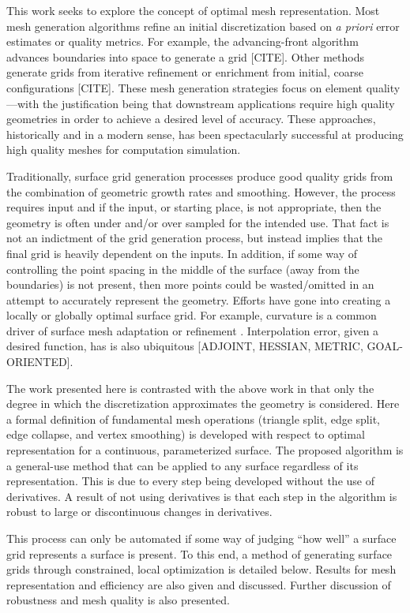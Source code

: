 This work seeks to explore the concept of optimal mesh representation.
Most mesh generation algorithms refine an initial discretization based
on {\it a priori} error estimates or quality metrics. For example, the
advancing-front algorithm advances boundaries into space to generate a
grid \cite{tristrano98, diaz-morcillo98}[CITE]. Other methods generate
grids from iterative refinement or enrichment from initial, coarse
configurations \cite{marcum98, marcum00, shewchuk02}[CITE]. These mesh
generation strategies focus on element quality---with the
justification being that downstream applications require high quality
geometries in order to achieve a desired level of accuracy. These
approaches, historically and in a modern sense, has been spectacularly
successful at producing high quality meshes for computation simulation.

Traditionally, surface grid generation processes produce good quality
grids from the combination of geometric growth rates and smoothing.
However, the process requires input and if the input, or starting place,
is not appropriate, then the geometry is often under and/or over sampled
for the intended use. That fact is not an indictment of the grid
generation process, but instead implies that the final grid is heavily
dependent on the inputs. In addition, if some way of controlling the
point spacing in the middle of the surface (away from the boundaries) is
not present, then more points could be wasted/omitted in an attempt to
accurately represent the geometry. Efforts have gone into
creating a locally or globally optimal surface grid. For example,
curvature is a common driver of surface mesh adaptation or refinement
\cite{siqueria13}. Interpolation error, given a desired function, has
is also ubiquitous [ADJOINT, HESSIAN, METRIC, GOAL-ORIENTED]\cite{}.

The work presented here is contrasted with the above work in that only
the degree in which the discretization approximates the geometry is
considered.  Here a formal definition of fundamental mesh operations
(triangle split, edge split, edge collapse, and vertex smoothing) is
developed with respect to optimal representation for a continuous,
parameterized surface. The proposed algorithm is a general-use method
that can be applied to any surface regardless of its representation.
This is due to every step being developed without the use of
derivatives. A result of not using derivatives is that each step in the
algorithm is robust to large or discontinuous changes in derivatives.

This process can only be automated if some way of judging ``how well'' a
surface grid represents a surface is present. To this end, a method of
generating surface grids through constrained, local optimization is
detailed below. Results for mesh representation and efficiency are also
given and discussed. Further discussion of robustness and mesh quality
is also presented.
